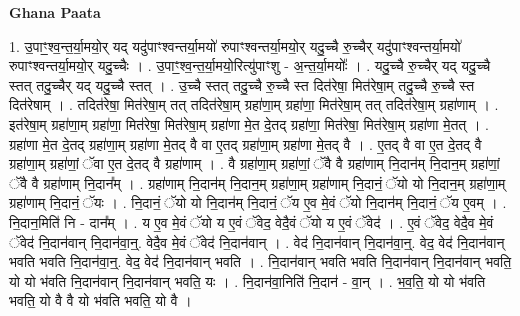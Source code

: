 \documentclass[17pt]{extarticle}
\begin{document}
\textbf{Ghana Paata } \newline

1. उ॒पाꣳ॒॒श्व॒न्त॒र्या॒मयो॒र् यद् यदु॑पाꣳश्वन्तर्या॒मयो॑ रुपाꣳश्वन्तर्या॒मयो॒र् यदु॒च्चै रु॒च्चैर् यदु॑पाꣳश्वन्तर्या॒मयो॑ रुपाꣳश्वन्तर्या॒मयो॒र् यदु॒च्चैः । . उ॒पाꣳ॒॒श्व॒न्त॒र्या॒मयो॒रित्यु॑पाꣳशु - अ॒न्त॒र्या॒मयोः᳚ । . यदु॒च्चै रु॒च्चैर् यद् यदु॒च्चै स्तत् तदु॒च्चैर् यद् यदु॒च्चै स्तत् । . उ॒च्चै स्तत् तदु॒च्चै रु॒च्चै स्त दित॑रेषा॒ मित॑रेषा॒म् तदु॒च्चै रु॒च्चै स्त दित॑रेषाम् । . तदित॑रेषा॒ मित॑रेषा॒म् तत् तदित॑रेषा॒म् ग्रहा॑णा॒म् ग्रहा॑णा॒ मित॑रेषा॒म् तत् तदित॑रेषा॒म् ग्रहा॑णाम् । . इत॑रेषा॒म् ग्रहा॑णा॒म् ग्रहा॑णा॒ मित॑रेषा॒ मित॑रेषा॒म् ग्रहा॑णा मे॒त दे॒तद् ग्रहा॑णा॒ मित॑रेषा॒ मित॑रेषा॒म् ग्रहा॑णा मे॒तत् । . ग्रहा॑णा मे॒त दे॒तद् ग्रहा॑णा॒म् ग्रहा॑णा मे॒तद् वै वा ए॒तद् ग्रहा॑णा॒म् ग्रहा॑णा मे॒तद् वै । . ए॒तद् वै वा ए॒त दे॒तद् वै ग्रहा॑णा॒म् ग्रहा॑णां॒ ॅवा ए॒त दे॒तद् वै ग्रहा॑णाम् । . वै ग्रहा॑णा॒म् ग्रहा॑णां॒ ॅवै वै ग्रहा॑णाम् नि॒दान॑म् नि॒दान॒म् ग्रहा॑णां॒ ॅवै वै ग्रहा॑णाम् नि॒दान᳚म् । . ग्रहा॑णाम् नि॒दान॑म् नि॒दान॒म् ग्रहा॑णा॒म् ग्रहा॑णाम् नि॒दानं॒ ॅयो यो नि॒दान॒म् ग्रहा॑णा॒म् ग्रहा॑णाम् नि॒दानं॒ ॅयः । . नि॒दानं॒ ॅयो यो नि॒दान॑म् नि॒दानं॒ ॅय ए॒व मे॒वं ॅयो नि॒दान॑म् नि॒दानं॒ ॅय ए॒वम् । . नि॒दान॒मिति॑ नि - दान᳚म् । . य ए॒व मे॒वं ॅयो य ए॒वं ॅवेद॒ वेदै॒वं ॅयो य ए॒वं ॅवेद॑ । . ए॒वं ॅवेद॒ वेदै॒व मे॒वं ॅवेद॑ नि॒दान॑वान् नि॒दान॑वा॒न्॒. वेदै॒व मे॒वं ॅवेद॑ नि॒दान॑वान् । . वेद॑ नि॒दान॑वान् नि॒दान॑वा॒न्॒. वेद॒ वेद॑ नि॒दान॑वान् भवति भवति नि॒दान॑वा॒न्॒. वेद॒ वेद॑ नि॒दान॑वान् भवति । . नि॒दान॑वान् भवति भवति नि॒दान॑वान् नि॒दान॑वान् भवति॒ यो यो भ॑वति नि॒दान॑वान् नि॒दान॑वान् भवति॒ यः । . नि॒दान॑वा॒निति॑ नि॒दान॑ - वा॒न् । . भ॒व॒ति॒ यो यो भ॑वति भवति॒ यो वै वै यो भ॑वति भवति॒ यो वै । \newline
\end{document}
